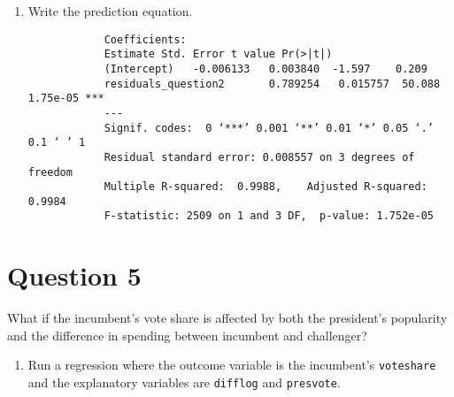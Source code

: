 \documentclass[12pt,letterpaper]{article}
\begin{document}
\begin{enumerate}
\begin{enumerate}
					\begin{lstlisting}[language=R]
			# Dataset
			inc.sub <- read.csv("https://raw.githubusercontent.com/ASDS-TCD/StatsI_Fall2023/main/datasets/incumbents_subset.csv")
			
			# Make a scatterplot of the two variables and add the regression line
			plot(residuals_question2, residuals_question1, main="Scatterplot of Residuals from Question 2 and Question 1 with Regression Line")abline(lm_model_residuals, col="red")
		\end{enumerate}
		\end{lstlisting}			
		\vspace{0.05cm}
		\begin{figure}[h!]
		\centering
		\texttt{[image: /Users/iseli/Documents/GitHub/StatsI\_Fall2023/problemSets/PS03/my\_answers/Rplot 4.png]}
		\caption{Scatterplot of Residuals Q1 and Residuals Q2 with Regression Line}
		\label{fig:scatterplot residuals q1 and residuals q2}
		\end{figure}
		
		\vspace{0.05cm}
		
		\item Write the prediction equation.
					\begin{verbatim}			
			Coefficients:
			Estimate Std. Error t value Pr(>|t|)    
			(Intercept)   -0.006133   0.003840  -1.597    0.209 
			residuals_question2       0.789254   0.015757  50.088 1.75e-05 ***
			---
			Signif. codes:  0 ‘***’ 0.001 ‘**’ 0.01 ‘*’ 0.05 ‘.’ 0.1 ‘ ’ 1
			Residual standard error: 0.008557 on 3 degrees of freedom
			Multiple R-squared:  0.9988,	Adjusted R-squared:  0.9984 
			F-statistic: 2509 on 1 and 3 DF,  p-value: 1.752e-05
		\end{verbatim}
		
	\end{enumerate}

\section*{Question 5}
\noindent What if the incumbent's vote share is affected by both the president's popularity and the difference in spending between incumbent and challenger? 
	\begin{enumerate}
		\item Run a regression where the outcome variable is the incumbent's \texttt{voteshare} and the explanatory variables are \texttt{difflog} and \texttt{presvote}.	\vspace{0.05cm}
		

\end{enumerate}
\end{enumerate}
\end{document}
